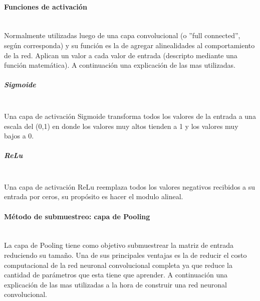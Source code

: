 \paragraph{Funciones de activación}\mbox{}\\

Normalmente utilizadas luego de una capa convolucional (o ''full connected'', según corresponda) y su función es la de agregar alinealidades al comportamiento de la red. Aplican un valor a cada valor de entrada (descripto mediante una función matemática). A continuación una explicación de las mas utilizadas.\par

\subparagraph{Sigmoide}\mbox{}\\

Una capa de activación Sigmoide transforma todos los valores de la entrada a una escala del (0,1) en donde los valores muy altos tienden a 1 y los valores muy bajos a 0.

\begin{figure}[!h]
\centering
\scalebox{.5}{ }
\label{fig:sigmoide}
\end{figure}

\subparagraph{ReLu}\mbox{}\\

Una capa de activación ReLu reemplaza todos los valores negativos recibidos a su entrada por ceros, su propósito es hacer el modulo alineal.

\begin{figure}[!h]
\centering
\scalebox{.5}{ }
\label{fig:relu}
\end{figure}

\paragraph{Método de submuestreo: capa de Pooling}\mbox{}\\

La capa de Pooling tiene como objetivo submuestrear la matriz de entrada reduciendo su tamaño. Una de sus principales ventajas es la de reducir el costo computacional de la red neuronal convolucional completa ya que reduce la cantidad de parámetros que esta tiene que aprender. A continuación una explicación de las mas utilizadas a la hora de construir una red neuronal convolucional. \par 

